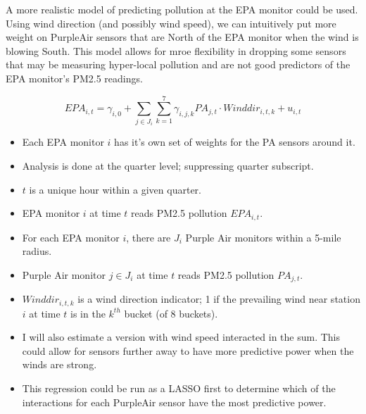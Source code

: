 \documentclass[12pt]{article}
\begin{document}
A more realistic model of predicting pollution at the EPA monitor could be used. Using wind direction (and possibly wind speed), we can intuitively put more weight on PurpleAir sensors that are North of the EPA monitor when the wind is blowing South. This model allows for mroe flexibility in dropping some sensors that may be measuring hyper-local pollution and are not good predictors of the EPA monitor's PM2.5 readings.

\[
EPA_{i,t} = \gamma_{i,0} + \sum\limits_{j\in J_i}\sum\limits_{k=1}^7\gamma_{i,j,k} 
PA_{j,t} \cdot Winddir_{i,t,k} + u_{i,t}
\]

\begin{itemize}
\item Each EPA monitor $i$ has it's own set of weights for the PA sensors around it.
\item Analysis is done at the quarter level; suppressing quarter subscript.
\item $t$ is a unique hour within a given quarter.
\item EPA monitor $i$ at time $t$ reads PM2.5 pollution $EPA_{i,t}$.
\item For each EPA monitor $i$, there are $J_i$ Purple Air monitors within a 5-mile radius.
\item Purple Air monitor $j\in J_i$ at time $t$ reads PM2.5 pollution $PA_{j,t}$.
\item $Winddir_{i,t,k} $ is a wind direction indicator; 1 if the prevailing wind near station $i$ at time $t$ is in the $k^{th}$ bucket (of 8 buckets).
\item I will also estimate a version with wind speed interacted in the sum. This could allow for sensors further away to have more predictive power when the winds are strong.
\item This regression could be run as a LASSO first to determine which of the interactions for each PurpleAir sensor have the most predictive power.
\end{itemize}



% 
\end{document}
